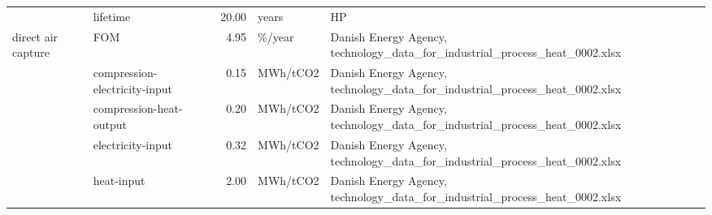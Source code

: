 \begin{longtable}{p{5cm}p{3cm}rp{3cm}p{11cm}}
                      & lifetime &          20.00 &                             years &                                                                                                                                                                                                                                                                                                                                   HP \\
direct air capture & FOM &           4.95 &                            \%/year &                                                                                                                                                                                                                                                          Danish Energy Agency, technology\_data\_for\_industrial\_process\_heat\_0002.xlsx \\
                      & compression-electricity-input &           0.15 &                          MWh/tCO2 &                                                                                                                                                                                                                                                          Danish Energy Agency, technology\_data\_for\_industrial\_process\_heat\_0002.xlsx \\
                      & compression-heat-output &           0.20 &                          MWh/tCO2 &                                                                                                                                                                                                                                                          Danish Energy Agency, technology\_data\_for\_industrial\_process\_heat\_0002.xlsx \\
                      & electricity-input &           0.32 &                          MWh/tCO2 &                                                                                                                                                                                                                                                          Danish Energy Agency, technology\_data\_for\_industrial\_process\_heat\_0002.xlsx \\
                      & heat-input &           2.00 &                          MWh/tCO2 &                                                                                                                                                                                                                                                          Danish Energy Agency, technology\_data\_for\_industrial\_process\_heat\_0002.xlsx \\

\end{longtable}
